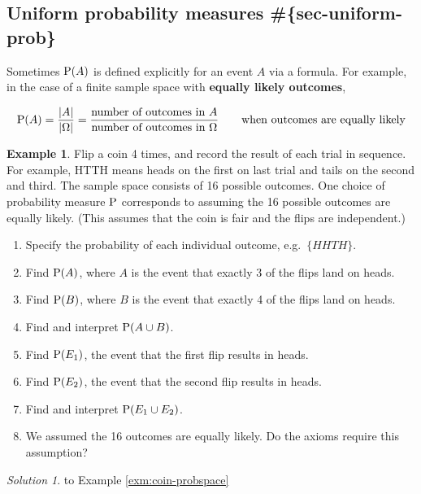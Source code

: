 \documentclass[
]{book}
\providecommand{\tightlist}{%
  \setlength{\itemsep}{0pt}\setlength{\parskip}{0pt}}
\theoremstyle{definition}
\theoremstyle{definition}
\newtheorem{example}{Example}[chapter]
\theoremstyle{definition}
\theoremstyle{remark}
\newtheorem*{solution}{Solution}
\begin{document}
\hypertarget{uniform-probability-measures-sec-uniform-prob}{%
\subsection{Uniform probability measures \#\{sec-uniform-prob\}}\label{uniform-probability-measures-sec-uniform-prob}}

Sometimes \(\textrm{P}(A)\) is defined explicitly for an event \(A\) via a formula. For example, in the case of a finite sample space with \textbf{equally likely outcomes},

\[
\textrm{P}(A) = \frac{|A|}{|\Omega|} = \frac{\text{number of outcomes in $A$}}{\text{number of outcomes in $\Omega$}} \qquad{\text{when outcomes are equally likely}}
\]

\begin{example}
\protect\hypertarget{exm:coin-probspace}{}{\label{exm:coin-probspace} }
Flip a coin 4 times, and record the result of each trial in sequence. For example, HTTH means heads on the first on last trial and tails on the second and third. The sample space consists of 16 possible outcomes. One choice of probability measure \(\textrm{P}\) corresponds to assuming the 16 possible outcomes are equally likely. (This assumes that the coin is fair and the flips are independent.)
\end{example}

\begin{enumerate}
\def\labelenumi{\arabic{enumi}.}
\tightlist
\item
  Specify the probability of each individual outcome, e.g.~\(\{HHTH\}\).\\
\item
  Find \(\textrm{P}(A)\), where \(A\) is the event that exactly 3 of the flips land on heads.
\item
  Find \(\textrm{P}(B)\), where \(B\) is the event that exactly 4 of the flips land on heads.
\item
  Find and interpret \(\textrm{P}(A \cup B)\).
\item
  Find \(\textrm{P}(E_1)\), the event that the first flip results in heads.
\item
  Find \(\textrm{P}(E_2)\), the event that the second flip results in heads.
\item
  Find and interpret \(\textrm{P}(E_1 \cup E_2)\).
\item
  We assumed the 16 outcomes are equally likely. Do the axioms require this assumption?
\end{enumerate}

\begin{solution}
{}
to Example \ref{exm:coin-probspace}
\end{solution}
\end{document}
